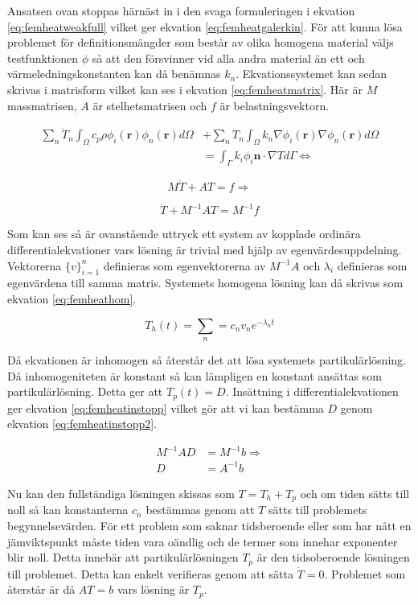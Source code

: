 \noindent
Ansatsen ovan stoppas härnäst in i den svaga formuleringen i ekvation
\eqref{eq:femheatweakfull} vilket ger ekvation \eqref{eq:femheatgalerkin}.
För att kunna lösa problemet för definitionsmängder som består av olika
homogena material väljs testfunktionen $\phi$ så att den försvinner vid
alla andra material än ett och värmeledningskonstanten kan då benämnas $k_n$.
Ekvationssystemet kan sedan skrivas i matrisform vilket kan ses i ekvation
\eqref{eq:femheatmatrix}. Här är $M$ massmatrisen, $A$ är stelhetsmatrisen och
$f$ är belastningsvektorn.

\begin{align}
\label{eq:femheatgalerkin}
\sum_n \dot{T}_n \int_\Omega c_p\rho\phi_i(\mathbf{r})
\phi_n(\mathbf{r})d\Omega
& + \sum_n T_n \int_\Omega k_n \nabla\phi_i(\mathbf{r})\nabla\phi_n(\mathbf{r})
d\Omega \\
&= \int_\Gamma k_i\phi_i\mathbf{n}\cdot\nabla Td\Gamma \Leftrightarrow
\nonumber
\end{align}

\begin{equation}
\label{eq:femheatmatrix}
M\dot{T} + AT = f \Rightarrow
\end{equation}

\begin{equation}
\label{eq:femheatmatrix2}
\dot{T} + M^{-1}AT = M^{-1}f
\end{equation}

\noindent
Som kan ses så är ovanstående uttryck ett system av kopplade ordinära
differentialekvationer vars lösning är trivial med hjälp av egenvärdesuppdelning.
Vektorerna $\{v\}^n_{i=1}$ definieras som egenvektorerna av
$M^{-1}A$ och $\lambda_i$ definieras som egenvärdena till samma matris.
Systemets homogena lösning kan då skrivas som ekvation
\eqref{eq:femheathom}.\cite{lay06}

\begin{equation}
\label{eq:femheathom}
T_h(t) = \sum_n = c_nv_ne^{-\lambda_nt}
\end{equation}

\noindent
Då ekvationen är inhomogen så återstår det att lösa systemets
partikulärlösning. Då inhomogeniteten är konstant så kan lämpligen
en konstant ansättas som partikulärlösning. Detta ger att
$T_p(t) = D$. Insättning i differentialekvationen ger
ekvation \eqref{eq:femheatinstopp} vilket gör att vi kan bestämma
$D$ genom ekvation \eqref{eq:femheatinstopp2}.

\begin{align}
\label{eq:femheatinstopp}
M^{-1}AD &= M^{-1}b \Rightarrow\\
\label{eq:femheatinstopp2}
D &= A^{-1}b
\end{align}

\noindent
Nu kan den fullständiga lösningen skissas som $T = T_h + T_p$ och om
tiden sätts till noll så kan konstanterna $c_n$ bestämmas genom
att $T$ sätts till problemets begynnelsevärden. För ett problem som
saknar tidsberoende eller som har nått en jämviktspunkt måste
tiden vara oändlig och de termer som innehar exponenter blir noll.
Detta innebär att partikulärlösningen $T_p$ är den tidsoberoende lösningen
till problemet. Detta kan enkelt verifieras genom att sätta $\dot{T} = 0$.
Problemet som återstår är då $AT = b$ vars lösning är $T_p$.

